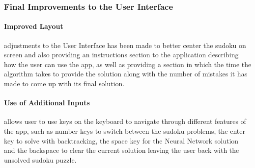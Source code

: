 \documentclass[]{final_report}
\begin{document}
\subsubsection{Final Improvements to the User Interface}

\paragraph{Improved Layout}
adjustments to the User Interface has been made to better center the sudoku on screen and also providing an instructions section to the application describing how the user can use the app, as well as providing a section in which the time the algorithm takes to provide the solution along with the number of mistakes it has made to come up with its final solution.

\paragraph{Use of Additional Inputs}
allows user to use keys on the keyboard to navigate through different features of the app, such as number keys to switch between the sudoku problems, the enter key to solve with backtracking, the space key for the Neural Network solution and the backspace to clear the current solution leaving the user back with the unsolved sudoku puzzle.
\end{document}
